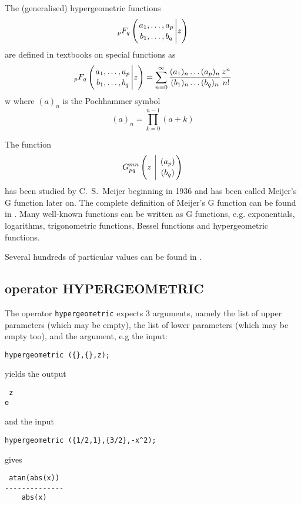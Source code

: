 
The (generalised) hypergeometric functions  
\begin{displaymath}
_pF_q \left( {{a_1, \ldots , a_p} \atop {b_1, \ldots ,b_q}} \Bigg\vert z \right)
\end{displaymath}
are defined in textbooks on special functions as
\begin{displaymath}
_pF_q \left( {{a_1, \ldots , a_p} \atop {b_1, \ldots ,b_q}} \Bigg\vert z \right)
  = \sum_{n=0}^{\infty}\frac{(a_{1})_{n}\dots(a_{p})_{n}}{(b_{1})_{n}\dots(b_{q})_{n}}\frac{z^{n}}{n!}
\end{displaymath}w
where $(a)_{n}$ is the Pochhammer symbol
\begin{displaymath}
 (a)_{n} = \prod_{k=0}^{n-1} (a+k)
\end{displaymath}

The function 
\begin{displaymath}
G_{p q}^{m n} \left( z \  \Bigg\vert \  {(a_p) \atop (b_q)} \right)
\end{displaymath}
has been studied by C.~S.~Meijer beginning in 1936 and has been
called Meijer's G function later on. The complete definition of Meijer's
G function can be found in \cite{Prudnikov:90}.
Many well-known functions can be written as G functions,
e.g. exponentials, logarithms, trigonometric functions, Bessel functions
and hypergeometric functions.

Several hundreds of particular values can be found in \cite{Prudnikov:90}.


\subsection{\REDUCE{} operator HYPERGEOMETRIC}
\hypertarget{operator:HYPERGEOMETRIC}{}

The operator {\tt hypergeometric} expects 3 arguments, namely the 
list of upper parameters (which may be empty), the list of lower
parameters (which may be empty too), and the argument, e.g the input:
\begin{verbatim}
hypergeometric ({},{},z);
\end{verbatim}
yields the output
\begin{verbatim}
 z
e
\end{verbatim}
and the input
\begin{verbatim}
hypergeometric ({1/2,1},{3/2},-x^2);
\end{verbatim}
gives
\begin{verbatim}
 atan(abs(x))
--------------
    abs(x)
\end{verbatim}


